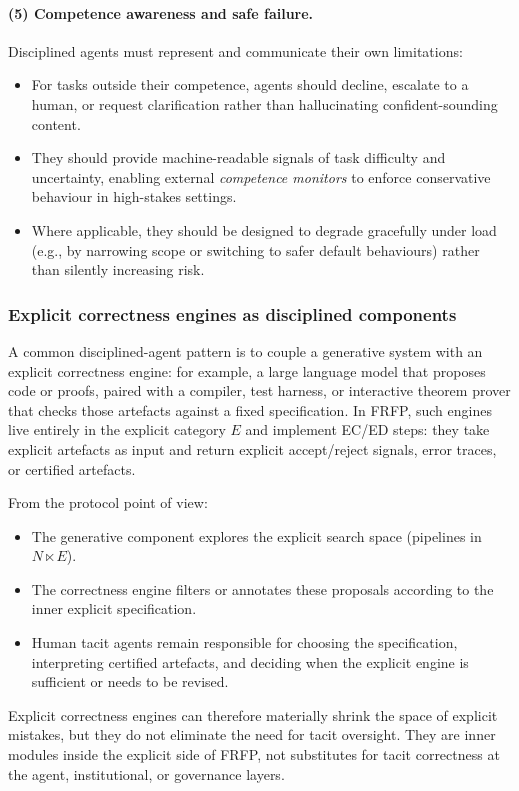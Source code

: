 \paragraph{(5) Competence awareness and safe failure.}
Disciplined agents must represent and communicate their own limitations:
\begin{itemize}
  \item For tasks outside their competence, agents should decline, escalate to a human, or request clarification rather than hallucinating confident-sounding content.
  \item They should provide machine-readable signals of task difficulty and uncertainty, enabling external \emph{competence monitors} to enforce conservative behaviour in high-stakes settings.
  \item Where applicable, they should be designed to degrade gracefully under load (e.g., by narrowing scope or switching to safer default behaviours) rather than silently increasing risk.
\end{itemize}

\subsubsection*{Explicit correctness engines as disciplined components}
A common disciplined-agent pattern is to couple a generative system with an explicit correctness engine:
for example, a large language model that proposes code or proofs, paired with a compiler, test harness,
or interactive theorem prover that checks those artefacts against a fixed specification. In FRFP, such
engines live entirely in the explicit category $E$ and implement EC/ED steps: they take explicit artefacts
as input and return explicit accept/reject signals, error traces, or certified artefacts.

From the protocol point of view:
\begin{itemize}
  \item The generative component explores the explicit search space (pipelines in $N \ltimes E$).
  \item The correctness engine filters or annotates these proposals according to the inner explicit
        specification.
  \item Human tacit agents remain responsible for choosing the specification, interpreting certified
        artefacts, and deciding when the explicit engine is sufficient or needs to be revised.
\end{itemize}
Explicit correctness engines can therefore materially shrink the space of explicit mistakes, but they do
not eliminate the need for tacit oversight. They are inner modules inside the explicit side of FRFP,
not substitutes for tacit correctness at the agent, institutional, or governance layers.


